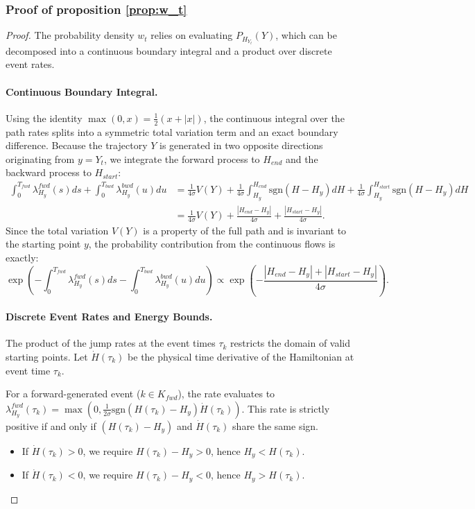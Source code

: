 \documentclass{article}
\begin{document}
\subsubsection{Proof of proposition \ref{prop:w_t}}
\begin{proof}
    The probability density $w_t$ relies on evaluating $P_{H_{Y_t}}(Y)$, which can be decomposed into a continuous boundary integral and a product over discrete event rates.
    
    \paragraph{Continuous Boundary Integral.}
    Using the identity $\max(0, x) = \frac{1}{2}(x + |x|)$, the continuous integral over the path rates splits into a symmetric total variation term and an exact boundary difference. Because the trajectory $Y$ is generated in two opposite directions originating from $y = Y_t$, we integrate the forward process to $H_{end}$ and the backward process to $H_{start}$:
    \begin{align*}
        \int_{0}^{T_{fwd}} \lambda_{H_y}^{fwd}(s) ds + \int_{0}^{T_{bwd}} \lambda_{H_y}^{bwd}(u) du 
        &= \frac{1}{4\sigma} V(Y) + \frac{1}{4\sigma} \int_{H_y}^{H_{end}} \text{sgn}(H - H_y) dH + \frac{1}{4\sigma} \int_{H_y}^{H_{start}} \text{sgn}(H - H_y) dH \\
        &= \frac{1}{4\sigma} V(Y) + \frac{|H_{end} - H_y|}{4\sigma} + \frac{|H_{start} - H_y|}{4\sigma}.
    \end{align*}
    Since the total variation $V(Y)$ is a property of the full path and is invariant to the starting point $y$, the probability contribution from the continuous flows is exactly:
    \begin{equation}
        \exp\left(-\int_0^{T_{fwd}} \lambda_{H_y}^{fwd}(s) ds - \int_0^{T_{bwd}} \lambda_{H_y}^{bwd}(u) du\right) \propto \exp\left( - \frac{|H_{end} - H_y| + |H_{start} - H_y|}{4\sigma} \right).
    \end{equation}

    \paragraph{Discrete Event Rates and Energy Bounds.}
    The product of the jump rates at the event times $\tau_k$ restricts the domain of valid starting points. Let $\dot{H}(\tau_k)$ be the physical time derivative of the Hamiltonian at event time $\tau_k$. 
    
    For a forward-generated event ($k \in K_{fwd}$), the rate evaluates to $\lambda_{H_y}^{fwd}(\tau_k) = \max\left(0, \frac{1}{2\sigma}\text{sgn}(H(\tau_k) - H_y)\dot{H}(\tau_k)\right)$. This rate is strictly positive if and only if $(H(\tau_k) - H_y)$ and $\dot{H}(\tau_k)$ share the same sign.
    \begin{itemize}
        \item If $\dot{H}(\tau_k) > 0$, we require $H(\tau_k) - H_y > 0$, hence $H_y < H(\tau_k)$.
        \item If $\dot{H}(\tau_k) < 0$, we require $H(\tau_k) - H_y < 0$, hence $H_y > H(\tau_k)$.
    \end{itemize}


\end{proof}
\end{document}
